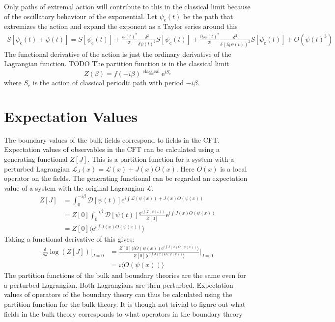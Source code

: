 \documentclass[12pt]{report}
\newcommand{\e}{\ensuremath{\mathrm{e}}}
\renewcommand{\L}{\ensuremath{\mathcal{L}}}
\renewcommand{\i}{\ensuremath{i}}
\begin{document}
Only paths of extremal action will contribute to this in the classical limit because of the oscillatory behaviour of the exponential. Let $\psi_\mathrm{c}(t)$ be the path that extremizes the action and expand the exponent as a Taylor series around this
\begin{equation}
\begin{split}
 S[\psi_\mathrm{c}(t)+\psi(t)]=S[\psi_\mathrm{c}(t)]+\frac{\psi(t)^2}{2!}\frac{\delta^2}{\delta\psi(t)^2} S[\psi_\mathrm{c}(t)]+
\frac{\partial_t\psi(t)^2}{2!}\frac{\delta^2}{\delta(\partial_t\psi(t))^2} S[\psi_\mathrm{c}(t)]+O(\psi(t)^3)
\end{split}
\end{equation}
The functional derivative of the action is just the ordinary derivative of the Lagrangian function. TODO
The partition function is in the classical limit
\begin{equation}
 Z(\beta)=f(-\i\beta)\stackrel{\mathrm{classical}}{=} \e^{i S_c}\label{classical}
\end{equation}
where $S_c$ is the action of classical periodic path with period $-\i\beta$.
\section{Expectation Values}
The boundary values of the bulk fields correspond to fields in the CFT. Expectation values of observables in the CFT can be calculated using a generating functional $Z[J]$. This is a partition function for a system with a perturbed Lagrangian $\L_J(x)=\L(x)+J(x)O(x)$. Here $O(x)$ is a local operator on the fields. The generating functional can be regarded an expectation value of a system with the original Lagrangian $\L$.
\begin{equation}
\begin{split}
 Z[J]&=\int_0^{-\i\beta} \mathcal{D}[\psi(t)]\e^{\i \int \L(\psi(x))+J(x)O(\psi(x))}\\
&=Z[0]\int_0^{-\i\beta} \mathcal{D}[\psi(t)]\frac{\e^{\i\int \L(\psi(x))}}{Z[0]}\e^{\i\int J(x)O(\psi(x))}\\
&=Z[0]\langle\e^{\i\int J(x)O(\psi(x))}\rangle
\end{split}
\end{equation}
Taking a functional derivative of this gives:
\begin{equation}
\begin{split}
 \frac{\delta}{\delta J}\log(Z[J])|_{J=0}&=\frac{Z[0]\langle\i O(\psi(x))\e^{\i\int J(x)O(\psi(x))}\rangle}{  Z[0]\langle\e^{\i \int J(x)O(\psi(x))}\rangle }\big |_{J=0}\\
&=\i \langle O(\psi(x))\rangle\label{expectation}
\end{split}
\end{equation}
The partition functions of the bulk and boundary theories are the same even for a perturbed Lagrangian. Both Lagrangians are then perturbed. Expectation values of operators of the boundary theory can thus be calculated using the partition function for the bulk theory. It is though not trivial to figure out what fields in the bulk theory corresponds to what operators in the boundary theory
\end{document}
